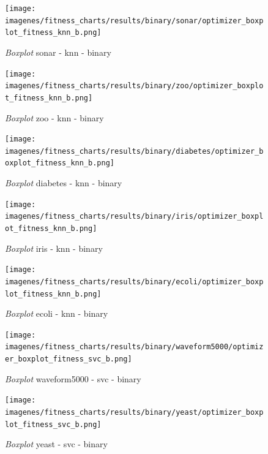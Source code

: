 \begin{figure}[htp]
    \centering
    \texttt{[image: imagenes/fitness\_charts/results/binary/sonar/optimizer\_boxplot\_fitness\_knn\_b.png]}
    \caption{\textit{Boxplot} sonar - knn - binary}

\end{figure}

\begin{figure}[htp]
    \centering
    \texttt{[image: imagenes/fitness\_charts/results/binary/zoo/optimizer\_boxplot\_fitness\_knn\_b.png]}
    \caption{\textit{Boxplot} zoo - knn - binary}

\end{figure}

\begin{figure}[htp]
    \centering
    \texttt{[image: imagenes/fitness\_charts/results/binary/diabetes/optimizer\_boxplot\_fitness\_knn\_b.png]}
    \caption{\textit{Boxplot} diabetes - knn - binary}

\end{figure}

\begin{figure}[htp]
    \centering
    \texttt{[image: imagenes/fitness\_charts/results/binary/iris/optimizer\_boxplot\_fitness\_knn\_b.png]}
    \caption{\textit{Boxplot} iris - knn - binary}

\end{figure}

\begin{figure}[htp]
    \centering
    \texttt{[image: imagenes/fitness\_charts/results/binary/ecoli/optimizer\_boxplot\_fitness\_knn\_b.png]}
    \caption{\textit{Boxplot} ecoli - knn - binary}

\end{figure}

\begin{figure}[htp]
    \centering
    \texttt{[image: imagenes/fitness\_charts/results/binary/waveform5000/optimizer\_boxplot\_fitness\_svc\_b.png]}
    \caption{\textit{Boxplot} waveform5000 - svc - binary}

\end{figure}

\begin{figure}[htp]
    \centering
    \texttt{[image: imagenes/fitness\_charts/results/binary/yeast/optimizer\_boxplot\_fitness\_svc\_b.png]}
    \caption{\textit{Boxplot} yeast - svc - binary}

\end{figure}


